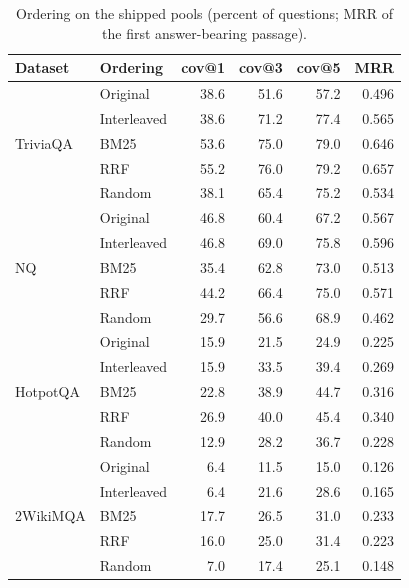 \begin{table}[!htbp]
\centering
\small
\caption{Ordering on the shipped pools (percent of questions; MRR of the first answer-bearing passage).}
\label{tab:ordering}
\begin{tabular}{llrrrr}
\toprule
Dataset & Ordering & cov@1 & cov@3 & cov@5 & MRR \\
\midrule
\multirow{5}{*}{TriviaQA} & Original & 38.6 & 51.6 & 57.2 & 0.496 \\
 & Interleaved & 38.6 & 71.2 & 77.4 & 0.565 \\
 & BM25 & 53.6 & 75.0 & 79.0 & 0.646 \\
 & RRF & 55.2 & 76.0 & 79.2 & 0.657 \\
 & Random & 38.1 & 65.4 & 75.2 & 0.534 \\
\midrule
\multirow{5}{*}{NQ} & Original & 46.8 & 60.4 & 67.2 & 0.567 \\
 & Interleaved & 46.8 & 69.0 & 75.8 & 0.596 \\
 & BM25 & 35.4 & 62.8 & 73.0 & 0.513 \\
 & RRF & 44.2 & 66.4 & 75.0 & 0.571 \\
 & Random & 29.7 & 56.6 & 68.9 & 0.462 \\
\midrule
\multirow{5}{*}{HotpotQA} & Original & 15.9 & 21.5 & 24.9 & 0.225 \\
 & Interleaved & 15.9 & 33.5 & 39.4 & 0.269 \\
 & BM25 & 22.8 & 38.9 & 44.7 & 0.316 \\
 & RRF & 26.9 & 40.0 & 45.4 & 0.340 \\
 & Random & 12.9 & 28.2 & 36.7 & 0.228 \\
\midrule
\multirow{5}{*}{2WikiMQA} & Original & 6.4 & 11.5 & 15.0 & 0.126 \\
 & Interleaved & 6.4 & 21.6 & 28.6 & 0.165 \\
 & BM25 & 17.7 & 26.5 & 31.0 & 0.233 \\
 & RRF & 16.0 & 25.0 & 31.4 & 0.223 \\
 & Random & 7.0 & 17.4 & 25.1 & 0.148 \\
\bottomrule
\end{tabular}
\end{table}

\begin{table}[!htbp]
\centering
\small
\caption{Paired comparison, RRF versus MADKE order, cov@3.}
\label{tab:paired}
\setlength{\tabcolsep}{4pt}
\end{table}

